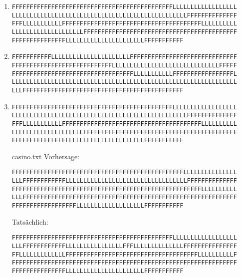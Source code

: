 \documentclass{homework}
\begin{document}
\begin{enumerate}
\begin{enumerate}
\item \begin{verbatim}
FFFFFFFFFFFFFFFFFFFFFFFFFFFFFFFFFFFFFFFFFFFFFLLLLLLLLLLLLLLLLLL
LLLLLLLLLLLLLLLLLLLLLLLLLLLLLLLLLLLLLLLLLLLLLLLLLFFFFFFFFFFFFFF
FFFLLLLLLLLLLLFFFFFFFFFFFFFFFFFFFFFFFFFFFFFFFFFFFFFFFLLLLLLLLLL
LLLLLLLLLLLLLLLLLLLLFFFFFFFFFFFFFFFFFFFFFFFFFFFFFFFFFFFFFFFFFFF
FFFFFFFFFFFFFFFLLLLLLLLLLLLLLLLLLLLLLFFFFFFFFFFF
\end{verbatim}
	
\item \begin{verbatim}
FFFFFFFFFFFLLLLLLLLLLLLLLLLLLLLLLFFFFFFFFFFFFFFFFFFFFFFFFFFFFFF
FFFFFFFFFFFFFFFFFFFFFFFFFFFFLLLLLLLLLLLLLLLLLLLLLLLLLLLLLLFFFFF
FFFFFFFFFFFFFFFFFFFFFFFFFFFFFFFFFFLLLLLLLLLLLFFFFFFFFFFFFFFFFFL
LLLLLLLLLLLLLLLLLLLLLLLLLLLLLLLLLLLLLLLLLLLLLLLLLLLLLLLLLLLLLLL
LLLFFFFFFFFFFFFFFFFFFFFFFFFFFFFFFFFFFFFFFFFFFFFF
\end{verbatim}

\item \begin{verbatim}
FFFFFFFFFFFFFFFFFFFFFFFFFFFFFFFFFFFFFFFFFFFFFLLLLLLLLLLLLLLLLLL
LLLLLLLLLLLLLLLLLLLLLLLLLLLLLLLLLLLLLLLLLLLLLLLLLFFFFFFFFFFFFFF
FFFLLLLLLLLLLLFFFFFFFFFFFFFFFFFFFFFFFFFFFFFFFFFFFFFFFLLLLLLLLLL
LLLLLLLLLLLLLLLLLLLLFFFFFFFFFFFFFFFFFFFFFFFFFFFFFFFFFFFFFFFFFFF
FFFFFFFFFFFFFFFLLLLLLLLLLLLLLLLLLLLLLFFFFFFFFFFF
\end{verbatim}

\item[casino.txt] Vorhersage:
\begin{verbatim}
FFFFFFFFFFFFFFFFFFFFFFFFFFFFFFFFFFFFFFFFFFFFFFFFLLLLLLLLLLLLLLL
LLLFFFFFFFFFFFFLLLLLLLLLLLLLLLLLLLLLLLLLLLLLLLLLLFFFFFFFFFFFFFF
FFFFFFFFFFFFFFFFFFFFFFFFFFFFFFFFFFFFFFFFFFFFFFFFFFFFFLLLLLLLLLL
LLLFFFFFFFFFFFFFFFFFFFFFFFFFFFFFFFFFFFFFFFFFFFFFFFFFFFFFFFFFFFF
FFFFFFFFFFFFFFFFFFLLLLLLLLLLLLLLLLLLLFFFFFFFFFFF
\end{verbatim}
Tatsächlich:
\begin{verbatim}
FFFFFFFFFFFFFFFFFFFFFFFFFFFFFFFFFFFFFFFFFFFFFLLLLLLLLLLLLLLLLLL
LLLFFFFFFFFFFFFLLLLLLLLLLLLLLLLFFFLLLLLLLLLLLLLLFFFFFFFFFFFFFFF
FFLLLLLLLLLLLLLFFFFFFFFFFFFFFFFFFFFFFFFFFFFFFFFFFFFFLLLLLLLLLLF
FFFFFFFFFFFFFFFFFFFFFFFFFFFFFFFFFFFFFFFFFFFFFFFFFFFFFFFFFFFFFFF
FFFFFFFFFFFFFFFLLLLLLLLLLLLLLLLLLLLLLFFFFFFFFFFF
\end{verbatim}

\end{enumerate}

\end{enumerate}
\end{document}
